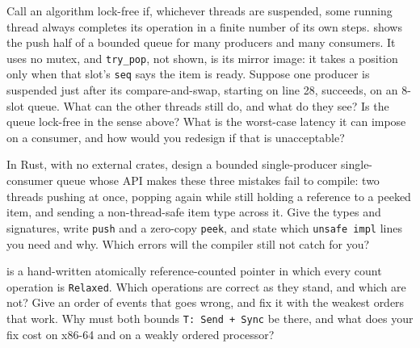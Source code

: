 \begin{question}\label{iq:iv3:low-latency:33}
Call an algorithm lock-free if, whichever threads are suspended, some running thread always completes its operation in a finite number of its own steps.  shows the push half of a bounded queue for many producers and many consumers. It uses no mutex, and \texttt{try\_pop}, not shown, is its mirror image: it takes a position only when that slot's \texttt{seq} says the item is ready. Suppose one producer is suspended just after its compare-and-swap, starting on line 28, succeeds, on an 8-slot queue. What can the other threads still do, and what do they see? Is the queue lock-free in the sense above? What is the worst-case latency it can impose on a consumer, and how would you redesign if that is unacceptable?
\label{lst:iv3:ll:mpmc}
\end{question}

\begin{question}\label{iq:iv3:low-latency:34}
In Rust, with no external crates, design a bounded single-producer single-consumer queue whose API makes these three mistakes fail to compile: two threads pushing at once, popping again while still holding a reference to a peeked item, and sending a non-thread-safe item type across it. Give the types and signatures, write \texttt{push} and a zero-copy \texttt{peek}, and state which \texttt{unsafe impl} lines you need and why. Which errors will the compiler still not catch for you?
\end{question}

\begin{question}\label{iq:iv3:low-latency:35}
 is a hand-written atomically reference-counted pointer in which every count operation is \texttt{Relaxed}. Which operations are correct as they stand, and which are not? Give an order of events that goes wrong, and fix it with the weakest orders that work. Why must both bounds \texttt{T: Send + Sync} be there, and what does your fix cost on x86-64 and on a weakly ordered processor?
\label{lst:iv3:ll:myarc}
\end{question}
